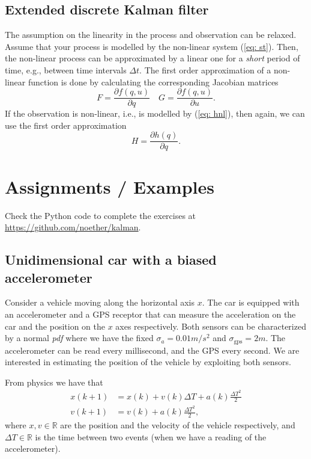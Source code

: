 \documentclass[11pt,a4paper]{article}
\begin{document}
\subsection{Extended discrete Kalman filter}
The assumption on the linearity in the process and observation can be relaxed. Assume that your process is modelled by the non-linear system (\ref{eq: st}). Then, the non-linear process can be approximated by a linear one for a \emph{short} period of time, e.g., between time intervals $\Delta t$. The first order approximation of a non-linear function is done by calculating the corresponding Jacobian matrices
\begin{equation}
	F = \frac{\partial f(q,u)}{\partial q} \quad G =  \frac{\partial f(q,u)}{\partial u}.
\end{equation}
If the observation is non-linear, i.e., is modelled by (\ref{eq: hnl}), then again, we can use the first order approximation
\begin{equation}
	H = \frac{\partial h(q)}{\partial q}.
\end{equation}

\section{Assignments / Examples}
Check the Python code to complete the exercises at \url{https://github.com/noether/kalman}.

\subsection{Unidimensional car with a biased accelerometer}
Consider a vehicle moving along the horizontal axis $x$. The car is equipped with an accelerometer and a GPS receptor that can measure the acceleration on the car and the position on the $x$ axes respectively. Both sensors can be characterized by a normal \emph{pdf} where we have the fixed $\sigma_{a} = 0.01 m/s^2$ and $\sigma_{\text{gps}} = 2 m$. The accelerometer can be read every millisecond, and the GPS every second. We are interested in estimating the position of the vehicle by exploiting both sensors.

From physics we have that
\begin{align}
		x(k+1) &= x(k) + v(k)\Delta T + a(k)\frac{\Delta T^2}{2} \\
		v(k+1) &= v(k) + a(k)\frac{\Delta T^2}{2},
\end{align}
where $x,v\in\mathbb{R}$ are the position and the velocity of the vehicle respectively, and $\Delta T\in\mathbb{R}$ is the time between two events (when we have a reading of the accelerometer).
\end{document}
